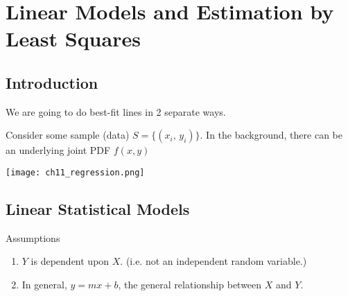 \chapter{Linear Models and Estimation by Least Squares}
\section{Introduction} We are going to do best-fit lines in 2 separate ways.

\nl Consider some sample (data) $S = \{(x_i,\, y_i)\}$. In the background, there can be an underlying joint PDF $f(x,y)$
\begin{center}\texttt{[image: ch11\_regression.png]}\end{center}
\section{Linear Statistical Models}

\noindent Assumptions
\begin{enumerate}[label=\textcircled{\raisebox{-1pt}{\arabic*}}]
    \item $Y$ is dependent upon $X$. (i.e. not an independent random variable.)
    \item In general, $y = mx + b$, the general relationship between $X$ and $Y$.
\end{enumerate} 








